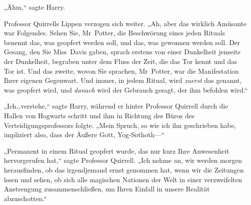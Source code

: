 „Ähm,“ sagte Harry.

Professor Quirrells Lippen verzogen sich weiter. „Ah, aber das wirklich Amüsante war Folgendes. Sehen Sie, Mr~Potter, die Beschwörung eines jeden Rituals benennt das, was geopfert werden soll, und das, was gewonnen werden soll. Der Gesang, den Sie Miss~Davis gaben, sprach erstens von einer Dunkelheit jenseits der Dunkelheit, begraben unter dem Fluss der Zeit, die das Tor kennt und das Tor ist. Und das zweite, wovon Sie sprachen, Mr~Potter, war die Manifestation Ihrer eigenen Gegenwart. Und immer, in jedem Ritual, wird \emph{zuerst} das genannt, was geopfert wird, und \emph{danach} wird der Gebrauch gesagt, der ihm befohlen wird.“

„Ich…verstehe,“ sagte Harry, während er hinter Professor Quirrell durch die Hallen von Hogwarts schritt und ihm in Richtung des Büros des Verteidigungsprofessors folgte. „Mein Spruch, so wie ich ihn geschrieben habe, impliziert also, dass der Äußere Gott, Yog-Sothoth—“

„Permanent in einem Ritual geopfert wurde, das nur kurz Ihre Anwesenheit hervorgerufen hat,“ sagte Professor Quirrell. „Ich nehme an, wir werden morgen herausfinden, ob das irgendjemand ernst genommen hat, wenn wir die Zeitungen lesen und sehen, ob sich alle magischen Nationen der Welt in einer verzweifelten Anstrengung zusammenschließen, um Ihren Einfall in unsere Realität abzuschotten.“

